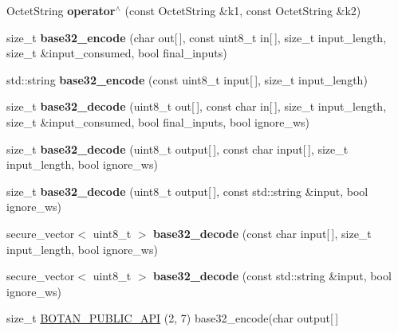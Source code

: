 \begin{DoxyCompactItemize}
Octet\+String {\bfseries operator$^\wedge$} (const Octet\+String \&k1, const Octet\+String \&k2)
\item 
\mbox{\label{namespace_botan_adf51f448f98c6bd2a7c6589fb251e115}} 
size\+\_\+t {\bfseries base32\+\_\+encode} (char out\mbox{[}$\,$\mbox{]}, const uint8\+\_\+t in\mbox{[}$\,$\mbox{]}, size\+\_\+t input\+\_\+length, size\+\_\+t \&input\+\_\+consumed, bool final\+\_\+inputs)
\item 
\mbox{\label{namespace_botan_a5b85657b0a03e7cc65f3974b13917e71}} 
std\+::string {\bfseries base32\+\_\+encode} (const uint8\+\_\+t input\mbox{[}$\,$\mbox{]}, size\+\_\+t input\+\_\+length)
\item 
\mbox{\label{namespace_botan_a8f86ba057620dffed61d624100cfd775}} 
size\+\_\+t {\bfseries base32\+\_\+decode} (uint8\+\_\+t out\mbox{[}$\,$\mbox{]}, const char in\mbox{[}$\,$\mbox{]}, size\+\_\+t input\+\_\+length, size\+\_\+t \&input\+\_\+consumed, bool final\+\_\+inputs, bool ignore\+\_\+ws)
\item 
\mbox{\label{namespace_botan_ab5444d427e473115a7ce981269a8dd40}} 
size\+\_\+t {\bfseries base32\+\_\+decode} (uint8\+\_\+t output\mbox{[}$\,$\mbox{]}, const char input\mbox{[}$\,$\mbox{]}, size\+\_\+t input\+\_\+length, bool ignore\+\_\+ws)
\item 
\mbox{\label{namespace_botan_a0f01fa22d60b66958a2140f811a2292b}} 
size\+\_\+t {\bfseries base32\+\_\+decode} (uint8\+\_\+t output\mbox{[}$\,$\mbox{]}, const std\+::string \&input, bool ignore\+\_\+ws)
\item 
\mbox{\label{namespace_botan_af9f2e9ca4f6822309f5181f2f9b78cb7}} 
secure\+\_\+vector$<$ uint8\+\_\+t $>$ {\bfseries base32\+\_\+decode} (const char input\mbox{[}$\,$\mbox{]}, size\+\_\+t input\+\_\+length, bool ignore\+\_\+ws)
\item 
\mbox{\label{namespace_botan_a03f9ae2ab50dd932d9ecae7dc988bdb9}} 
secure\+\_\+vector$<$ uint8\+\_\+t $>$ {\bfseries base32\+\_\+decode} (const std\+::string \&input, bool ignore\+\_\+ws)
\item 
size\+\_\+t \mbox{\hyperlink{namespace_botan_ad87a88225cfb55247f4a91b0b50da678}{B\+O\+T\+A\+N\+\_\+\+P\+U\+B\+L\+I\+C\+\_\+\+A\+PI}} (2, 7) base32\+\_\+encode(char output\mbox{[}$\,$\mbox{]}

\end{DoxyCompactItemize}
